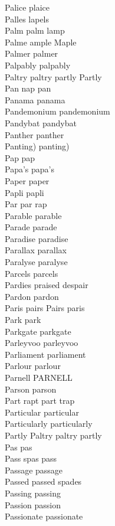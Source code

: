 Palice plaice\\
Palles lapels\\
Palm palm lamp\\
Palme ample Maple\\
Palmer palmer\\
Palpably palpably\\
Paltry paltry partly Partly\\
Pan nap pan\\
Panama panama\\
Pandemonium pandemonium\\
Pandybat pandybat\\
Panther panther\\
Panting) panting)\\
Pap pap\\
Papa's papa's\\
Paper paper\\
Papli papli\\
Par par rap\\
Parable parable\\
Parade parade\\
Paradise paradise\\
Parallax parallax\\
Paralyse paralyse\\
Parcels parcels\\
Pardies praised despair\\
Pardon pardon\\
Paris pairs Pairs paris\\
Park park\\
Parkgate parkgate\\
Parleyvoo parleyvoo\\
Parliament parliament\\
Parlour parlour\\
Parnell PARNELL\\
Parson parson\\
Part rapt part trap\\
Particular particular\\
Particularly particularly\\
Partly Paltry paltry partly\\
Pas pas\\
Pass spas pass\\
Passage passage\\
Passed passed spades\\
Passing passing\\
Passion passion\\
Passionate passionate\\
